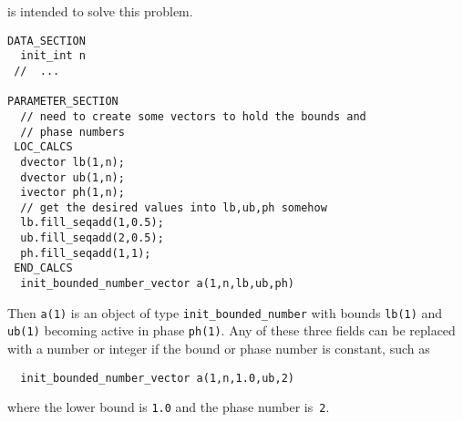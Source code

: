 is intended to solve this problem.
\begin{lstlisting}
DATA_SECTION
  init_int n
 //  ...

PARAMETER_SECTION
  // need to create some vectors to hold the bounds and
  // phase numbers
 LOC_CALCS
  dvector lb(1,n); 
  dvector ub(1,n); 
  ivector ph(1,n); 
  // get the desired values into lb,ub,ph somehow 
  lb.fill_seqadd(1,0.5);
  ub.fill_seqadd(2,0.5);
  ph.fill_seqadd(1,1);
 END_CALCS
  init_bounded_number_vector a(1,n,lb,ub,ph)
\end{lstlisting} 
Then \texttt{a(1)} is an object of type
\texttt{init\_bounded\_number} with bounds \texttt{lb(1)} and 
\texttt{ub(1)} becoming active in phase \texttt{ph(1)}. 
Any of these three fields can be replaced with a number or
integer if the bound or phase number is constant, such as
\begin{lstlisting}
  init_bounded_number_vector a(1,n,1.0,ub,2)
\end{lstlisting} 
where the lower bound is \texttt{1.0} and the
phase number is~\texttt{2}.


